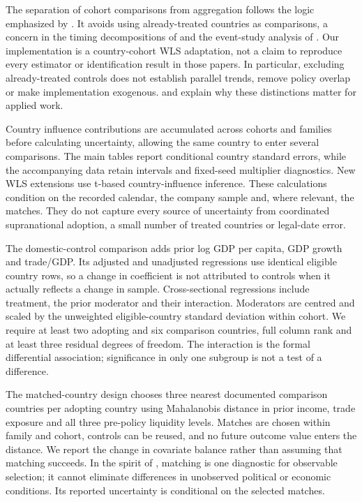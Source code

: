 \documentclass[12pt,letterpaper]{article}
\makeatletter
\renewcommand{\subsection}{\@startsection{subsection}{2}{\z@}{-3.25ex plus -1ex minus -.2ex}{1.5ex plus .2ex}{\normalfont\normalsize\bfseries}}
\makeatother
\begin{document}
The separation of cohort comparisons from aggregation follows the logic emphasized by \citet{callaway2021}. It avoids using already-treated countries as comparisons, a concern in the timing decompositions of \citet{goodmanbacon2021} and the event-study analysis of \citet{sun2021}. Our implementation is a country-cohort WLS adaptation, not a claim to reproduce every estimator or identification result in those papers. In particular, excluding already-treated controls does not establish parallel trends, remove policy overlap or make implementation exogenous. \citet{baker2022} and \citet{roth2023} explain why these distinctions matter for applied work.


Country influence contributions are accumulated across cohorts and families before calculating uncertainty, allowing the same country to enter several comparisons. The main tables report conditional country standard errors, while the accompanying data retain intervals and fixed-seed multiplier diagnostics. New WLS extensions use t-based country-influence inference. These calculations condition on the recorded calendar, the company sample and, where relevant, the matches. They do not capture every source of uncertainty from coordinated supranational adoption, a small number of treated countries or legal-date error.


\subsection{Additional regressions}

The domestic-control comparison adds prior log GDP per capita, GDP growth and trade/GDP. Its adjusted and unadjusted regressions use identical eligible country rows, so a change in coefficient is not attributed to controls when it actually reflects a change in sample. Cross-sectional regressions include treatment, the prior moderator and their interaction. Moderators are centred and scaled by the unweighted eligible-country standard deviation within cohort. We require at least two adopting and six comparison countries, full column rank and at least three residual degrees of freedom. The interaction is the formal differential association; significance in only one subgroup is not a test of a difference.


The matched-country design chooses three nearest documented comparison countries per adopting country using Mahalanobis distance in prior income, trade exposure and all three pre-policy liquidity levels. Matches are chosen within family and cohort, controls can be reused, and no future outcome value enters the distance. We report the change in covariate balance rather than assuming that matching succeeds. In the spirit of \citet{dube2021}, matching is one diagnostic for observable selection; it cannot eliminate differences in unobserved political or economic conditions. Its reported uncertainty is conditional on the selected matches.
\end{document}
